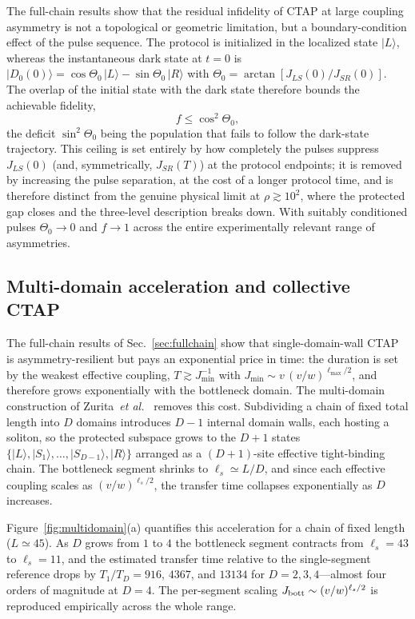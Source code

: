 \documentclass[
  reprint,
  amsmath,
  amssymb,
  aps,
  prb,
  floatfix,
  longbibliography,
]{revtex4-2}
\begin{document}
The full-chain results show that the residual infidelity of CTAP at large coupling
asymmetry is not a topological or geometric limitation, but a boundary-condition
effect of the pulse sequence. The protocol is initialized in the localized state
$|L\rangle$, whereas the instantaneous dark state at $t=0$ is
$|D_0(0)\rangle = \cos\Theta_0\,|L\rangle - \sin\Theta_0\,|R\rangle$ with
$\Theta_0 = \arctan[J_{LS}(0)/J_{SR}(0)]$. The overlap of the initial state with the
dark state therefore bounds the achievable fidelity,
\begin{equation}
f \le \cos^2\Theta_0 ,
\label{eq:ceiling}
\end{equation}
the deficit $\sin^2\Theta_0$ being the population that fails to follow the
dark-state trajectory. This ceiling is set entirely by how completely the pulses
suppress $J_{LS}(0)$ (and, symmetrically, $J_{SR}(T)$) at the protocol endpoints;
it is removed by increasing the pulse separation, at the cost of a longer protocol
time, and is therefore distinct from the genuine physical limit at
$\rho \gtrsim 10^2$, where the protected gap closes and the three-level description
breaks down. With suitably conditioned pulses $\Theta_0 \to 0$ and $f \to 1$ across
the entire experimentally relevant range of asymmetries.

\subsection{Multi-domain acceleration and collective CTAP}
\label{sec:multidomain}

The full-chain results of Sec.~\ref{sec:fullchain} show that single-domain-wall
CTAP is asymmetry-resilient but pays an exponential price in time: the duration
is set by the weakest effective coupling, $T\gtrsim J_{\min}^{-1}$ with
$J_{\min}\sim v\,(v/w)^{\ell_{\max}/2}$, and therefore grows exponentially with
the bottleneck domain. The multi-domain construction of
Zurita~\emph{et al.}~\cite{Zurita2023} removes this cost. Subdividing a chain of
fixed total length into $D$ domains introduces $D-1$ internal domain walls, each
hosting a soliton, so the protected subspace grows to the $D+1$ states
$\{|L\rangle,|S_1\rangle,\dots,|S_{D-1}\rangle,|R\rangle\}$ arranged as a
$(D+1)$-site effective tight-binding chain. The bottleneck segment shrinks to
$\ell_s\simeq L/D$, and since each effective coupling scales as $(v/w)^{\ell_s/2}$,
the transfer time collapses exponentially as $D$ increases.

Figure~\ref{fig:multidomain}(a) quantifies this acceleration for a chain of fixed
length ($L\simeq45$). As $D$ grows from $1$ to $4$ the bottleneck segment
contracts from $\ell_s=43$ to $\ell_s=11$, and the estimated transfer time
relative to the single-segment reference drops by $T_1/T_D=916$, $4367$, and
$13134$ for $D=2,3,4$---almost four orders of magnitude at $D=4$. The per-segment
scaling $J_{\rm bott}\sim(v/w)^{\ell_s/2}$ is reproduced empirically across the
whole range.
\end{document}
